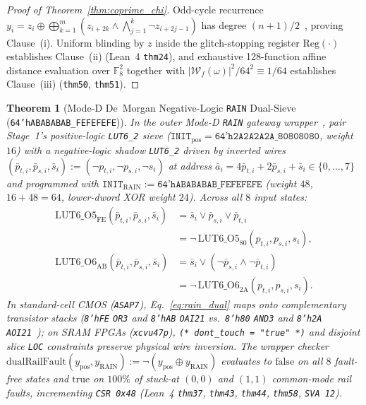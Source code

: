\documentclass[11pt,letterpaper]{article}
\theoremstyle{spectralthm}
\newtheorem{theorem}{Theorem}[section]
\begin{document}
\begin{proof}[Proof of Theorem~\ref{thm:coprime_chi}]
Odd-cycle recurrence $y_i = z_i \oplus \bigoplus_{k=1}^m (z_{i+2k} \wedge \bigwedge_{j=1}^k \neg z_{i+2j-1})$ has degree $(n+1)/2$~\cite{daemen1995cipher}, proving Clause~(i). Uniform blinding by $z$ inside the glitch-stopping register $\mathrm{Reg}(\cdot)$ establishes Clause~(ii) (Lean~4 \texttt{thm24}), and exhaustive 128-function affine distance evaluation over $\mathbb{F}_8^2$ together with $|\mathcal{W}_f(\omega)|^2 / 64^2 \equiv 1/64$ establishes Clause~(iii) (\texttt{thm50}, \texttt{thm51}).
\end{proof}

\begin{theorem}[Mode-D De~Morgan Negative-Logic \texttt{RAIN} Dual-Sieve (\texttt{64'hABABABAB\_FEFEFEFE})]
\label{thm:comonad_rain}
\label{thm:rain_demorgan_duality}
In the outer Mode-D \texttt{RAIN} gateway wrapper~\cite{mitra2000commonmode, ncdsmo2020rain}, pair Stage~1's positive-logic \mbox{\texttt{LUT6\_2}} sieve ($\texttt{INIT}_{\mathrm{pos}} = \texttt{64'h2A2A2A2A\_80808080}$, weight $16$) with a negative-logic shadow \mbox{\texttt{LUT6\_2}} driven by inverted wires $(\bar{p}_{t,i}, \bar{p}_{s,i}, \bar{s}_i) := (\neg p_{t,i}, \neg p_{s,i}, \neg s_i)$ at address $\bar{a}_i = 4\bar{p}_{t,i} + 2\bar{p}_{s,i} + \bar{s}_i \in \{0,\ldots,7\}$ and programmed with $\texttt{INIT}_{\mathrm{RAIN}} := \texttt{64'hABABABAB\_FEFEFEFE}$ (weight $48$, $16 + 48 = 64$, lower-dword XOR weight $24$). Across all $8$ input states:
\begin{equation}
\begin{aligned}
\mathrm{LUT6\_O5}_{\mathrm{FE}}(\bar{p}_{t,i},\bar{p}_{s,i},\bar{s}_i)
  &= \bar{s}_i \vee \bar{p}_{s,i} \vee \bar{p}_{t,i} \\
  &= \neg\,\mathrm{LUT6\_O5}_{80}(p_{t,i},p_{s,i},s_i), \\[3pt]
\mathrm{LUT6\_O6}_{\mathrm{AB}}(\bar{p}_{t,i},\bar{p}_{s,i},\bar{s}_i)
  &= \bar{s}_i \vee (\neg\bar{p}_{s,i}\wedge\neg\bar{p}_{t,i}) \\
  &= \neg\,\mathrm{LUT6\_O6}_{2\mathrm{A}}(p_{t,i},p_{s,i},s_i).
\end{aligned}
\label{eq:rain_dual}
\end{equation}
In standard-cell CMOS (\texttt{ASAP7}), Eq.~\eqref{eq:rain_dual} maps onto complementary transistor stacks (\texttt{8'hFE} \texttt{OR3} and \texttt{8'hAB} \texttt{OAI21} vs.\ \texttt{8'h80} \texttt{AND3} and \texttt{8'h2A} \texttt{AOI21}~\cite{mitra2000commonmode}); on SRAM FPGAs (\texttt{xcvu47p}), \texttt{(* dont\_touch = "true" *)} and disjoint slice \texttt{LOC} constraints preserve physical wire inversion. The wrapper checker $\mathrm{dualRailFault}(y_{\mathrm{pos}}, y_{\mathrm{RAIN}}) := \neg(y_{\mathrm{pos}} \oplus y_{\mathrm{RAIN}})$ evaluates to $\mathrm{false}$ on all $8$ fault-free states and $\mathrm{true}$ on $100\%$ of stuck-at $(0,0)$ and $(1,1)$ common-mode rail faults, incrementing \texttt{CSR 0x48} (Lean~4 \texttt{thm37}, \texttt{thm43}, \texttt{thm44}, \texttt{thm58}, \texttt{SVA 12}).
\end{theorem}
\end{document}
